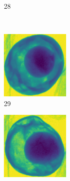 \documentclass[11pt]{article}
\begin{document}
\begin{figure}[!h]
\begin{subfigure}[b]{0.22\textwidth}
         \caption{28}
         \label{fig:avo_27}
     \end{subfigure}
          \\
    \begin{subfigure}[b]{0.22\textwidth}
         \centering
         \includegraphics[width=\textwidth]{figurer/avocado_dataset/avo_28.jpg}
         \caption{29}
         \label{fig:avo_28}
     \end{subfigure}
     \hfill
     \begin{subfigure}[b]{0.22\textwidth}
         \centering
         \includegraphics[width=\textwidth]{figurer/avocado_dataset/avo_29.jpg}

\end{subfigure}
\end{figure}
\end{document}
